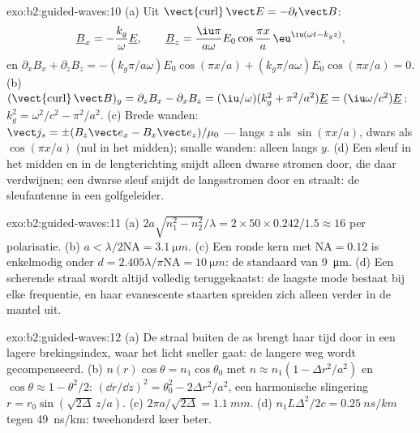 \begin{solution}{exo:b2:guided-waves:10}
(a) Uit $\operatorname{\vect{curl}}\vect E = -\partial_t\vect B$:
\[
\underline B_x = -\frac{k_g}\omega\underline E , \qquad
\underline B_z = \frac{\iu\pi}{a\omega}E_0\cos\frac{\pi x}a\,\eu^{\iu(\omega t - k_gz)} ,
\]
en
$\partial_xB_x + \partial_zB_z = -(k_g\pi/a\omega)E_0\cos(\pi x/a) + (k_g\pi/a\omega)E_0
\cos(\pi x/a) = 0$.
(b)
$(\operatorname{\vect{curl}}\vect B)_y = \partial_zB_x - \partial_xB_z =
(\iu/\omega)(k_g^2 + \pi^2/a^2)\underline E = (\iu\omega/c^2)\underline E$:
$k_g^2 = \omega^2/c^2 - \pi^2/a^2$. (c) Brede wanden:
$\vect j_s = \pm(B_z\vect e_x - B_x\vect e_z)/\mu_0$ --- langs $z$ als
$\sin(\pi x/a)$, dwars als $\cos(\pi x/a)$ (nul in het midden); smalle
wanden: alleen langs $y$. (d) Een sleuf in het midden en in de
lengterichting snijdt alleen dwarse stromen door, die daar verdwijnen; een
dwarse sleuf snijdt de langsstromen door en straalt: de sleufantenne in een
golfgeleider.
\end{solution}

\begin{solution}{exo:b2:guided-waves:11}
(a)
$2a\sqrt{n_1^2 - n_2^2}/\lambda = 2 \times 50 \times 0.242/1.5 \approx 16$
per polarisatie. (b) $a < \lambda/2\mathrm{NA} = \qty{3.1}{\micro m}$. (c)
Een ronde kern met $\mathrm{NA} =
0.12$ is enkelmodig onder
$d = 2.405\lambda/\pi\mathrm{NA} = \qty{10}{\micro m}$: de standaard van
\qty{9}{\micro m}. (d) Een scherende straal wordt altijd volledig
teruggekaatst: de laagste mode bestaat bij elke frequentie, en haar
evanescente staarten spreiden zich alleen verder in de mantel uit.
\end{solution}

\begin{solution}{exo:b2:guided-waves:12}
(a) De straal buiten de as brengt haar tijd door in een lagere
brekingsindex, waar het licht sneller gaat: de langere weg wordt
gecompenseerd. (b) $n(r)\cos\theta = n_1\cos\theta_0$ met
$n \approx n_1(1 - \Delta r^2/a^2)$ en $\cos\theta \approx 1 - \theta^2/2$:
$(\dd r/\dd z)^2 =
\theta_0^2 - 2\Delta r^2/a^2$, een harmonische slingering
$r = r_0\sin(\sqrt{2\Delta}\,z/a)$. (c)
$2\pi a/\sqrt{2\Delta} = \qty{1.1}{mm}$. (d)
$n_1L\Delta^2/2c = \qty{0.25}{ns/km}$ tegen \qty{49}{ns/km}: tweehonderd
keer beter.
\end{solution}

